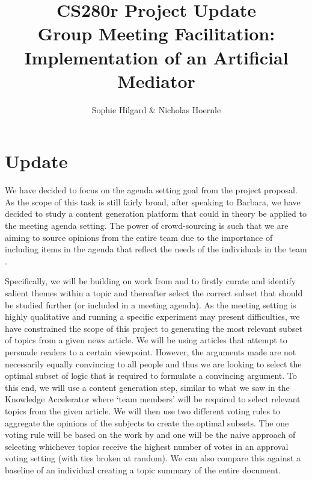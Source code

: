 \documentclass[final,authoryear,11pt,times]{elsarticle}
\begin{document}
\begin{frontmatter}

\title{CS280r Project Update \\ Group Meeting Facilitation: Implementation of an Artificial Mediator}


\author{Sophie Hilgard \& Nicholas Hoernle}


\end{frontmatter}

\section{Update}
We have decided to focus on the agenda setting goal from the project proposal. As the scope of this task is still fairly broad, after speaking to Barbara, we have decided to study a content generation platform that could in theory be applied to the meeting agenda setting. The power of crowd-sourcing is such that we are aiming to source opinions from the entire team due to the importance of including items in the agenda that reflect the needs of the individuals in the team \citep{schwartz2015design}.

Specifically, we will be building on work from \citet{hahn2016knowledge} and \citep{caragiannis2017subset} to firstly curate and identify salient themes within a topic and thereafter select the correct subset that should be studied further (or included in a meeting agenda). As the meeting setting is highly qualitative and running a specific experiment may present difficulties, we have constrained the scope of this project to generating the most relevant subset of topics from a given news article. We will be using articles that attempt to persuade readers to a certain viewpoint. However, the arguments made are not necessarily equally convincing to all people and thus we are looking to select the optimal subset of logic that is required to formulate a convincing argument. To this end, we will use a content generation step, similar to what we saw in the Knowledge Accelerator where `team members' will be required to select relevant topics from the given article. We will then use two different voting rules to aggregate the opinions of the subjects to create the optimal subsets. The one voting rule will be based on the work by \citet{caragiannis2017subset} and one will be the naive approach of selecting whichever topics receive the highest number of votes in an approval voting setting (with ties broken at random). We can also compare this against a baseline of an individual creating a topic summary of the entire document.



\end{document}
